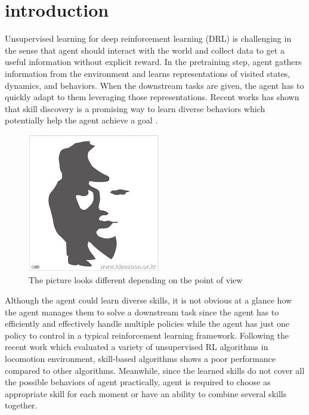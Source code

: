 \section{introduction}
\label{submission}

Unsupervised learning for deep reinforcement learning (DRL) is challenging
in the sense that agent should interact with the world and collect data to get a useful information
without explicit reward. In the pretraining step, agent gathers information from the environment
and learns representations of visited states, dynamics, and behaviors. When the downstream tasks are
given, the agent has to quickly adapt to them leveraging those representations. Recent works has shown that
skill discovery is a promising way to learn diverse behaviors which potentially help the agent achieve a goal
 \cite{salge2014empowerment, gregor2016variational, eysenbach2018diversity}.

\begin{figure}[ht]
    \vskip 0.2in
    \begin{center}
    \centerline{\includegraphics[width=0.5\columnwidth]{Figures/perspective_different_pic.png}}
    \caption{The picture looks different depending on the point of view}
    \label{perspective}
    \end{center}
    \vskip -0.2in
    \end{figure}
  

Although the agent could learn diverse skills, it is not obvious at a glance
how the agent manages them to solve a downstream task since the agent has to efficiently and effectively handle
multiple policies while the agent has just one policy to control in a typical reinforcement learning framework. Following the recent work \cite{laskin2021urlb} which evaluated a variety of unsupervised RL algorithms in locomotion environment, skill-based algorithms shows a poor performance compared to other algorithms.
Meanwhile, since the learned skills do not cover all the possible behaviors of agent practically,
agent is required to choose as appropriate skill for each moment or have an ability to combine several skills together.

